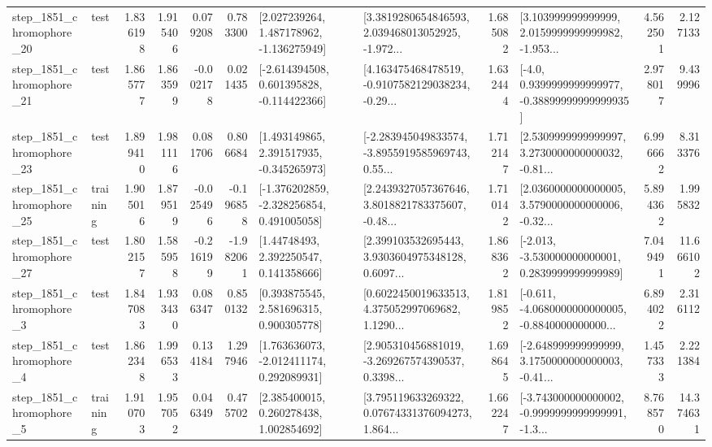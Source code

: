 \begin{tabular}{llrrrrllrlrr}
 step\_1851\_chromophore\_20 &      test &      1.836198 &    1.915406 &      0.079208 &  0.783300 &    [2.027239264, 1.487178962, -1.136275949] &  [3.3819280654846593, 2.039468013052925, -1.972... &       1.685082 &  [3.103999999999999, 2.0159999999999982, -1.953... &            4.562501 &          2.127133 \\
 step\_1851\_chromophore\_21 &      test &      1.865777 &    1.863599 &     -0.002178 &  0.021435 &   [-2.614394508, 0.601395828, -0.114422366] &  [4.163475468478519, -0.9107582129038234, -0.29... &       1.632444 &   [-4.0, 0.9399999999999977, -0.38899999999999935] &            2.978017 &          9.439996 \\
 step\_1851\_chromophore\_23 &      test &      1.899410 &    1.981116 &      0.081706 &  0.806684 &    [1.493149865, 2.391517935, -0.345265973] &  [-2.283945049833574, -3.8955919585969743, 0.55... &       1.712147 &  [2.5309999999999997, 3.2730000000000032, -0.81... &            6.996662 &          8.313376 \\
 step\_1851\_chromophore\_25 &  training &      1.905016 &    1.879519 &     -0.025496 & -0.196858 &   [-1.376202859, -2.328256854, 0.491005058] &  [2.2439327057367646, 3.8018821783375607, -0.48... &       1.710142 &  [2.0360000000000005, 3.5790000000000006, -0.32... &            5.894362 &          1.995832 \\
 step\_1851\_chromophore\_27 &      test &      1.802157 &    1.585958 &     -0.216199 & -1.982061 &      [1.44748493, 2.392250547, 0.141358666] &  [2.399103532695443, 3.9303604975348128, 0.6097... &       1.868362 &   [-2.013, -3.530000000000001, 0.2839999999999989] &            7.049491 &         11.666102 \\
  step\_1851\_chromophore\_3 &      test &      1.847083 &    1.933430 &      0.086347 &  0.850132 &     [0.393875545, 2.581696315, 0.900305778] &  [0.6022450019633513, 4.375052997069682, 1.1290... &       1.819852 &  [-0.611, -4.0680000000000005, -0.8840000000000... &            6.894022 &          2.316112 \\
  step\_1851\_chromophore\_4 &      test &      1.862348 &    1.996533 &      0.134184 &  1.297946 &    [1.763636073, -2.012411174, 0.292089931] &  [2.905310456881019, -3.269267574390537, 0.3398... &       1.698645 &  [-2.648999999999999, 3.1750000000000003, -0.41... &            1.457333 &          2.221384 \\
  step\_1851\_chromophore\_5 &  training &      1.910703 &    1.957052 &      0.046349 &  0.475702 &     [2.385400015, 0.260278438, 1.002854692] &  [3.795119633269322, 0.07674331376094273, 1.864... &       1.662247 &  [-3.743000000000002, -0.9999999999999991, -1.3... &            8.768570 &         14.374631 \\

\end{tabular}
